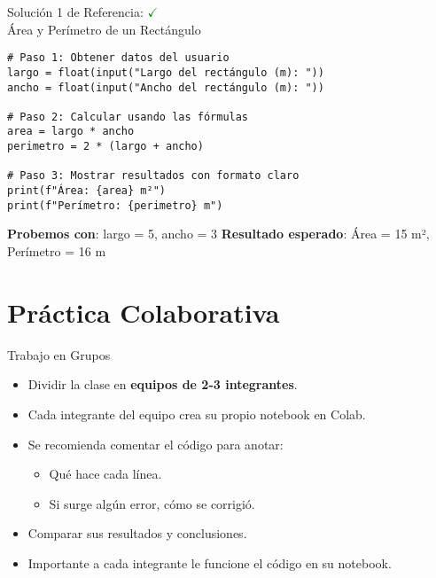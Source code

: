 \documentclass[10pt]{beamer}
\begin{document}
\begin{frame}[fragile]{Solución 1 de Referencia: \hfill \textcolor{green}{$\checkmark$} \\ Área y Perímetro de un Rectángulo}
\begin{verbatim}
# Paso 1: Obtener datos del usuario
largo = float(input("Largo del rectángulo (m): "))
ancho = float(input("Ancho del rectángulo (m): "))

# Paso 2: Calcular usando las fórmulas
area = largo * ancho
perimetro = 2 * (largo + ancho)

# Paso 3: Mostrar resultados con formato claro
print(f"Área: {area} m²")
print(f"Perímetro: {perimetro} m")
\end{verbatim}

\textbf{Probemos con}: largo = 5, ancho = 3
\textbf{Resultado esperado}: Área = 15 m², Perímetro = 16 m
\end{frame}


\section{Práctica Colaborativa}

\begin{frame}{Trabajo en Grupos}
  \begin{itemize}
    \item Dividir la clase en \textbf{equipos de 2-3 integrantes}.
    \item Cada integrante del equipo crea su propio notebook en Colab.
    \item Se recomienda comentar el código para anotar:
      \begin{itemize}
        \item Qué hace cada línea.
        \item Si surge algún error, cómo se corrigió.
      \end{itemize}
    \item Comparar sus resultados y conclusiones.
    \item Importante a cada integrante le funcione el código en su notebook.
  \end{itemize}
\end{frame}
\end{document}
